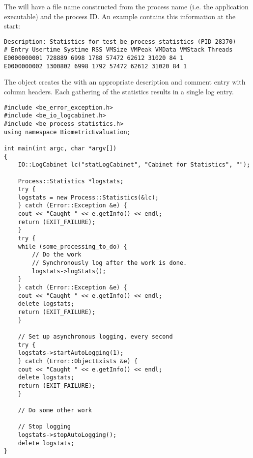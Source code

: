 The  will have a file name constructed from the process name (i.e.
the application executable) and the process ID. An example  contains
this information at the start:

\begin{verbatim}
Description: Statistics for test_be_process_statistics (PID 28370)
# Entry Usertime Systime RSS VMSize VMPeak VMData VMStack Threads
E0000000001 728889 6998 1788 57472 62612 31020 84 1
E0000000002 1300802 6998 1792 57472 62612 31020 84 1
\end{verbatim}

The  object creates the  with an appropriate description
and comment entry with column headers. Each gathering of the statistics results
in a single log entry.

\begin{lstlisting}[caption={Logging Process Statistics}, label=processstatisticslogging]
#include <be_error_exception.h>
#include <be_io_logcabinet.h>
#include <be_process_statistics.h>
using namespace BiometricEvaluation;

int main(int argc, char *argv[])
{
    IO::LogCabinet lc("statLogCabinet", "Cabinet for Statistics", "");

    Process::Statistics *logstats;
    try {
	logstats = new Process::Statistics(&lc);
    } catch (Error::Exception &e) {
	cout << "Caught " << e.getInfo() << endl;
	return (EXIT_FAILURE);
    }
    try {
	while (some_processing_to_do) {
	    // Do the work
	    // Synchronously log after the work is done.
	    logstats->logStats();
	}
    } catch (Error::Exception &e) {
	cout << "Caught " << e.getInfo() << endl;
	delete logstats;
	return (EXIT_FAILURE);
    }

    // Set up asynchronous logging, every second
    try {
	logstats->startAutoLogging(1);
    } catch (Error::ObjectExists &e) {
	cout << "Caught " << e.getInfo() << endl;
	delete logstats;
	return (EXIT_FAILURE);
    }

    // Do some other work

    // Stop logging
    logstats->stopAutoLogging();
    delete logstats;
}
\end{lstlisting}
